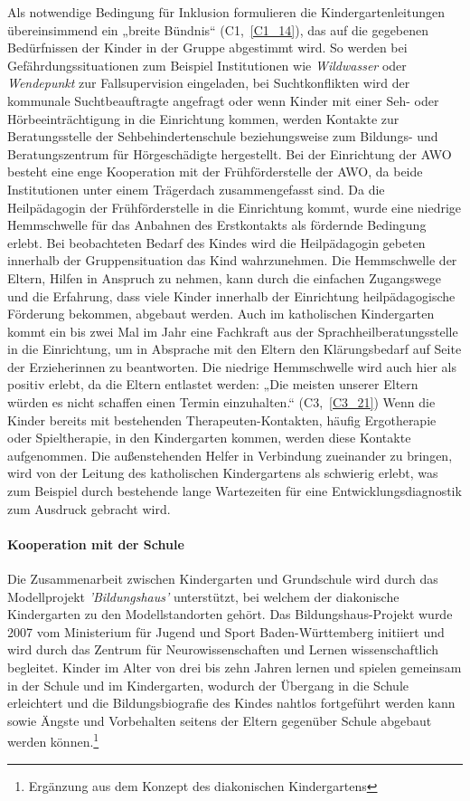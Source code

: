 Als notwendige Bedingung für Inklusion formulieren die Kindergartenleitungen übereinsimmend ein „breite Bündnis“ (C1,~\ref{C1_14}), das auf die gegebenen Bedürfnissen der Kinder in der Gruppe abgestimmt wird. So werden bei Gefährdungssituationen zum Beispiel Institutionen wie \emph{Wildwasser} oder \emph{Wendepunkt} zur Fallsupervision eingeladen, bei Suchtkonflikten wird der kommunale Suchtbeauftragte angefragt oder wenn Kinder mit einer Seh- oder Hörbeeinträchtigung in die Einrichtung kommen, werden Kontakte zur Beratungsstelle der Sehbehindertenschule beziehungsweise zum Bildungs- und Beratungszentrum für Hörgeschädigte hergestellt. Bei der Einrichtung der AWO besteht eine enge Kooperation mit der Frühförderstelle der AWO, da beide Institutionen unter einem Trägerdach zusammengefasst sind. Da die Heilpädagogin der Frühförderstelle in die Einrichtung kommt, wurde eine niedrige Hemmschwelle für das Anbahnen des Erstkontakts als fördernde Bedingung erlebt. Bei beobachteten  Bedarf des Kindes wird die Heilpädagogin gebeten innerhalb der Gruppensituation das Kind wahrzunehmen. Die Hemmschwelle der Eltern, Hilfen in Anspruch zu nehmen, kann durch die einfachen Zugangswege und die Erfahrung, dass viele Kinder innerhalb der Einrichtung heilpädagogische Förderung bekommen, abgebaut werden.
Auch im katholischen Kindergarten kommt ein bis zwei Mal im Jahr eine Fachkraft aus der Sprachheilberatungsstelle in die Einrichtung, um in Absprache mit den Eltern den Klärungsbedarf auf Seite der Erzieherinnen zu beantworten. Die niedrige Hemmschwelle wird auch hier als positiv erlebt, da die Eltern entlastet werden: „Die meisten unserer Eltern würden es nicht schaffen einen Termin einzuhalten.“ (C3,~\ref{C3_21}) 
Wenn die Kinder bereits mit bestehenden Therapeuten-Kontakten, häufig Ergotherapie oder Spieltherapie, in den Kindergarten kommen, werden diese Kontakte aufgenommen.     
Die außenstehenden Helfer in Verbindung zueinander zu bringen, wird von der Leitung des katholischen Kindergartens als schwierig erlebt, was zum Beispiel durch bestehende lange Wartezeiten für eine Entwicklungsdiagnostik zum Ausdruck gebracht wird. 
  
\paragraph{Kooperation mit der Schule}
Die Zusammenarbeit zwischen Kindergarten und Grundschule wird durch das Modellprojekt \emph{'Bildungshaus'} unterstützt, bei welchem der diakonische Kindergarten zu den Modellstandorten gehört. Das Bildungshaus-Projekt wurde 2007 vom Ministerium für Jugend und Sport Baden-Württemberg initiiert und wird durch das Zentrum für Neurowissenschaften und Lernen wissenschaftlich begleitet. 
Kinder im Alter von drei bis zehn Jahren lernen und spielen gemeinsam in der Schule und im Kindergarten, wodurch der Übergang in die Schule erleichtert und die Bildungsbiografie des Kindes nahtlos fortgeführt werden kann sowie Ängste und Vorbehalten seitens der Eltern gegenüber Schule abgebaut werden können.\footnote{Ergänzung aus dem Konzept des diakonischen Kindergartens}

